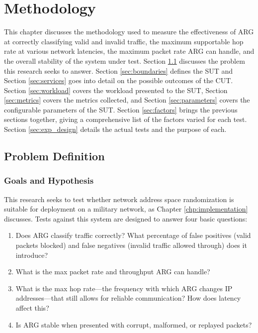 \chapter{Methodology}
\label{chp:methodology}

\par This chapter discusses the methodology used to measure the effectiveness of \ac{ARG} at correctly classifying valid and invalid traffic, the maximum supportable hop rate at various network latencies, the maximum packet rate \ac{ARG} can handle, and the overall stability of the system under test. Section \ref{sec:problem_def} discusses the problem this research seeks to answer. Section \ref{sec:boundaries} defines the \ac{SUT} and Section \ref{sec:services} goes into detail on the possible outcomes of the \ac{CUT}. Section \ref{sec:workload} covers the workload presented to the \ac{SUT}, Section \ref{sec:metrics} covers the metrics collected, and Section \ref{sec:parameters} covers the configurable parameters of the \ac{SUT}. Section \ref{sec:factors} brings the previous sections together, giving a comprehensive list of the factors varied for each test. Section \ref{sec:exp_design} details the actual tests and the purpose of each.

\section{Problem Definition}
\label{sec:problem_def}
\subsection{Goals and Hypothesis}
\label{sec:goals}
\par This research seeks to test whether network address space randomization is suitable for deployment on a military network, as Chapter \ref{chp:implementation} discusses. Tests against this system are designed to answer four basic questions:

\begin{enumerate}
\item Does \ac{ARG} classify traffic correctly? What percentage of false positives (valid packets blocked) and false negatives (invalid traffic allowed through) does it introduce?
\item What is the max packet rate and throughput \ac{ARG} can handle?
\item What is the max hop rate---the frequency with which \ac{ARG} changes \ac{IP} addresses---that still allows for reliable communication? How does latency affect this?
\item Is \ac{ARG} stable when presented with corrupt, malformed, or replayed packets?
\end{enumerate}

